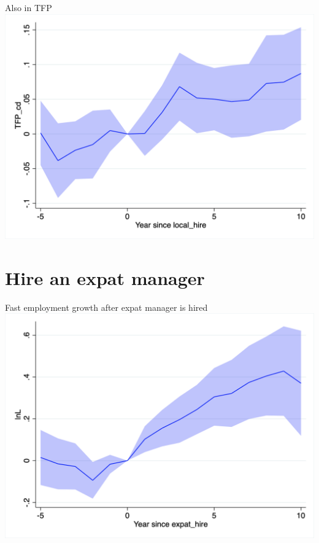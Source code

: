 \documentclass[
  ignorenonframetext,
  aspectratio=43,
]{beamer}
\begin{document}
\begin{frame}{Also in TFP}
\protect\hypertarget{also-in-tfp}{}
\includegraphics{figure/event_study/local_hire_TFP_cd.png}
\end{frame}

\hypertarget{hire-an-expat-manager}{%
\section{Hire an expat manager}\label{hire-an-expat-manager}}

\begin{frame}{Fast employment growth after expat manager is hired}
\protect\hypertarget{fast-employment-growth-after-expat-manager-is-hired}{}
\includegraphics{figure/event_study/expat_hire_lnL.png}
\end{frame}
\end{document}
